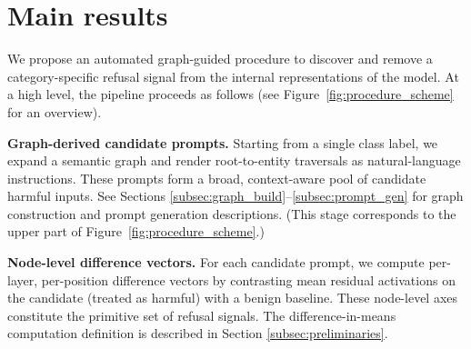 \documentclass{article}
\theoremstyle{plain}
\theoremstyle{definition}
\theoremstyle{remark}
\begin{document}



\section{Main results}
\label{subsec:method_procedure}
We propose an automated graph-guided procedure to discover and remove a category-specific refusal signal from the internal representations of the model. At a high level, the pipeline proceeds as follows (see Figure~\ref{fig:procedure_scheme} for an overview).

\textbf{Graph-derived candidate prompts.} Starting from a single class label, we expand a semantic graph and render root-to-entity traversals as natural-language instructions. These prompts form a broad, context-aware pool of candidate harmful inputs. See Sections \ref{subsec:graph_build}--\ref{subsec:prompt_gen} for graph construction and prompt generation descriptions. (This stage corresponds to the upper part of Figure~\ref{fig:procedure_scheme}.)

\textbf{Node-level difference vectors.} For each candidate prompt, we compute per-layer, per-position difference vectors by contrasting mean residual activations on the candidate (treated as harmful) with a benign baseline. These node-level axes constitute the primitive set of refusal signals. The difference-in-means computation definition is described in Section \ref{subsec:preliminaries}.
\end{document}
